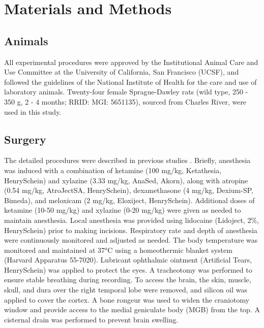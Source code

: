 \documentclass[11pt]{article}
\begin{document}
\section*{Materials and Methods}

\subsection*{Animals}
All experimental procedures were approved by the Institutional Animal Care and Use Committee at the University of California, San Francisco (UCSF), and followed the guidelines of the National Institute of Health for the care and use of laboratory animals. Twenty-four female Sprague-Dawley rats (wild type, 250 - 350 g, 2 - 4 months; RRID: MGI: 5651135), sourced from Charles River, were used in this study.

\subsection*{Surgery}
The detailed procedures were described in previous studies \citep{See2018, Homma2020}. Briefly, anesthesia was induced with a combination of ketamine (100 mg/kg, Ketathesia, HenrySchein) and xylazine (3.33 mg/kg, AnaSed, Akorn), along with atropine (0.54 mg/kg, AtroJectSA, HenrySchein), dexamethasone (4 mg/kg, Dexium-SP, Bimeda), and meloxicam (2 mg/kg, Eloxiject, HenrySchein). Additional doses of ketamine (10-50 mg/kg) and xylazine (0-20 mg/kg) were given as needed to maintain anesthesia. Local anesthesia was provided using lidocaine (Lidoject, 2\%, HenrySchein) prior to making incisions. Respiratory rate and depth of anesthesia were continuously monitored and adjusted as needed. The body temperature was monitored and maintained at 37°C using a homeothermic blanket system (Harvard Apparatus 55-7020). Lubricant ophthalmic ointment (Artificial Tears, HenrySchein) was applied to protect the eyes. A tracheotomy was performed to ensure stable breathing during recording. To access the brain, the skin, muscle, skull, and dura over the right temporal lobe were removed, and silicon oil was applied to cover the cortex. A bone rongeur was used to widen the craniotomy window and provide access to the medial geniculate body (MGB) from the top. A cisternal drain was performed to prevent brain swelling.
\end{document}
